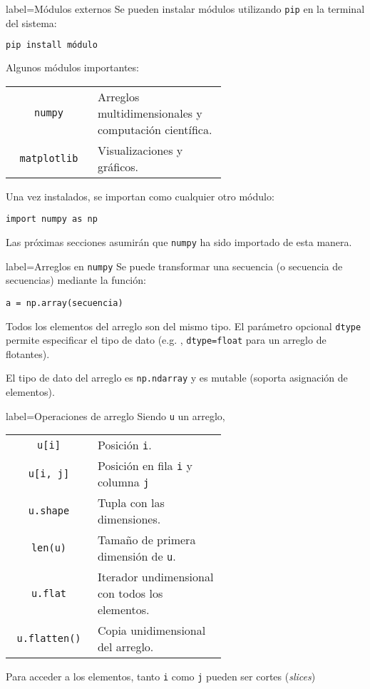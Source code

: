 \begin{contentbox}{label=Módulos externos}
    Se pueden instalar módulos utilizando \lstinline!pip! en la terminal del sistema:
\begin{lstlisting}[language=bash]
pip install módulo
\end{lstlisting}

    Algunos módulos importantes:
    
    \begin{tabular}{C|p{0.6\linewidth}}
        \lstinline!numpy! & Arreglos multidimensionales y computación científica. \\
        \lstinline!matplotlib! & Visualizaciones y gráficos.
    \end{tabular}
    
    Una vez instalados, se importan como cualquier otro módulo:
\begin{lstlisting}
import numpy as np
\end{lstlisting}
    Las próximas secciones asumirán que \lstinline!numpy! ha sido importado de esta manera.
\end{contentbox}

\begin{contentbox}{label=Arreglos en \lstinline!numpy!}
    Se puede transformar una secuencia (o secuencia de secuencias) mediante la función:
\begin{lstlisting}
a = np.array(secuencia)
\end{lstlisting}
    
    Todos los elementos del arreglo son del mismo tipo. El parámetro opcional \lstinline!dtype! permite especificar el tipo de dato (e.g. , \lstinline!dtype=float! para un arreglo de flotantes).
    
    El tipo de dato del arreglo es \lstinline!np.ndarray! y es mutable (soporta asignación de elementos).
\end{contentbox}

\begin{contentbox}{label=Operaciones de arreglo}
    Siendo \lstinline!u! un arreglo,
    
    \begin{tabular}{C|p{0.6\linewidth}}
        \lstinline!u[i]! & Posición \lstinline!i!. \\
        \lstinline!u[i, j]! & Posición en fila \lstinline!i! y columna \lstinline!j! \\
        \lstinline!u.shape! & Tupla con las dimensiones. \\
        \lstinline!len(u)! & Tamaño de primera dimensión de \lstinline!u!. \\
        \lstinline!u.flat! & Iterador undimensional con todos los elementos. \\
        \lstinline!u.flatten()! & Copia unidimensional del arreglo.
    \end{tabular}
    
    Para acceder a los elementos, tanto \lstinline!i! como \lstinline!j! pueden ser cortes (\textit{slices})
\end{contentbox}

